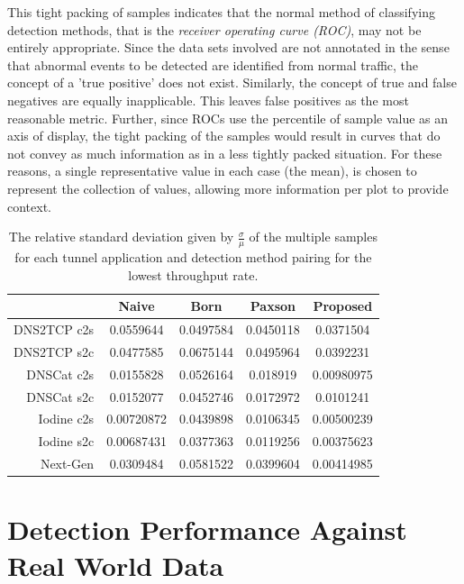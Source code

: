 \documentclass[12pt]{report}
\theoremstyle{remark}
\theoremstyle{definition}
\theoremstyle{definition}
\theoremstyle{definition}
\begin{document}
This tight packing of samples indicates that the normal method of classifying
detection methods, that is the \emph{receiver operating curve (ROC)}, may not be
entirely appropriate. Since the data sets involved are not annotated in the
sense that abnormal events to be detected are identified from normal traffic,
the concept of a 'true positive' does not exist. Similarly, the concept of true
and false negatives are equally inapplicable. This leaves false positives as the
most reasonable metric. Further, since ROCs use the percentile of sample value
as an axis of display, the tight packing of the samples would result in curves
that do not convey as much information as in a less tightly packed situation.
For these reasons, a single representative value in each case (the mean), is
chosen to represent the collection of values, allowing more information per plot
to provide context.

\begin{table}
\centering
\begin{tabular}{ r|cccc }
& Naive & Born & Paxson & Proposed \\
\hline
DNS2TCP c2s & 0.0559644 & 0.0497584 & 0.0450118 & 0.0371504 \\
DNS2TCP s2c & 0.0477585 & 0.0675144 & 0.0495964 & 0.0392231 \\
DNSCat c2s & 0.0155828 & 0.0526164 & 0.018919 & 0.00980975 \\
DNSCat s2c & 0.0152077 & 0.0452746 & 0.0172972 & 0.0101241 \\
Iodine c2s & 0.00720872 & 0.0439898 & 0.0106345 & 0.00500239 \\
Iodine s2c & 0.00687431 & 0.0377363 & 0.0119256 & 0.00375623 \\
Next-Gen & 0.0309484 & 0.0581522 & 0.0399604 & 0.00414985 \\
\end{tabular}
\caption[Relative Standard Deviation of Lowest Throughput Tunnel by Detection Method and Tunnel Application]{The relative standard deviation given by $\frac{\sigma}{\mu}$ of the multiple samples for each tunnel application and detection method pairing for the lowest throughput rate.}
\label{rsd-minimum}
\end{table}

\section{Detection Performance Against Real World Data}
\label{detection-perf}
\end{document}

